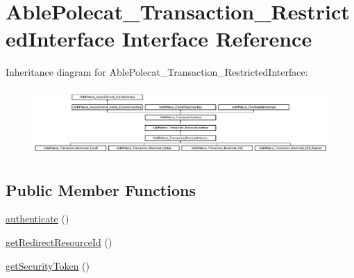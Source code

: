 \hypertarget{interface_able_polecat___transaction___restricted_interface}{}\section{Able\+Polecat\+\_\+\+Transaction\+\_\+\+Restricted\+Interface Interface Reference}
\label{interface_able_polecat___transaction___restricted_interface}
Inheritance diagram for Able\+Polecat\+\_\+\+Transaction\+\_\+\+Restricted\+Interface\+:\begin{figure}[H]
\begin{center}
\leavevmode
\includegraphics[height=2.560976cm]{interface_able_polecat___transaction___restricted_interface}
\end{center}
\end{figure}
\subsection*{Public Member Functions}
\begin{DoxyCompactItemize}
\item 
\hyperlink{interface_able_polecat___transaction___restricted_interface_a750c93a7dfab5314f2bf662a407bc5a6}{authenticate} ()
\item 
\hyperlink{interface_able_polecat___transaction___restricted_interface_abd12d28cbfdd5a45fba85bbac51a0b12}{get\+Redirect\+Resource\+Id} ()
\item 
\hyperlink{interface_able_polecat___transaction___restricted_interface_a09f538e74290cdbdffddfcfb5b379499}{get\+Security\+Token} ()
\end{DoxyCompactItemize}
